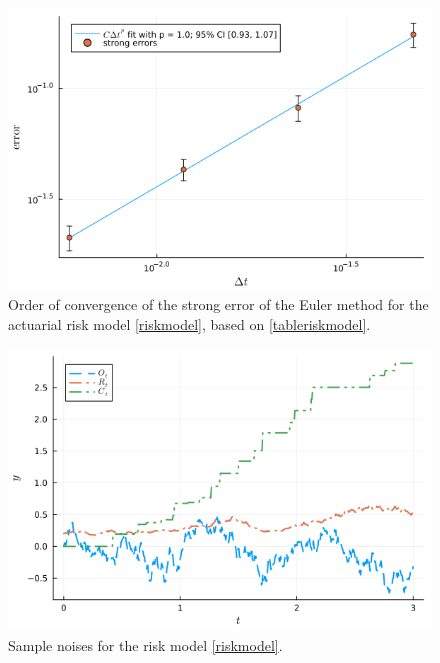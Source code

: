 \documentclass[reqno,12pt]{amsart}
\theoremstyle{plain} %
\theoremstyle{definition} %
\begin{document}
\begin{figure}[htb]
    \includegraphics[scale=0.6]{img/convergence_riskmodel.png}
    \caption{Order of convergence of the strong error of the Euler method for the actuarial risk model \eqref{riskmodel}, based on \cref{tableriskmodel}.}
    \label{figriskmodel}
\end{figure}

\begin{figure}[htb]
    \includegraphics[scale=0.6]{img/riskmodel_noises.png}
    \caption{Sample noises for the risk model \eqref{riskmodel}.}
    \label{figriskmodelnoise}
\end{figure}
\end{document}
